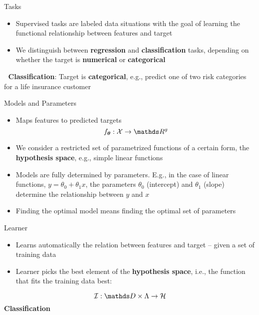 \documentclass[11pt,compress,t,notes=noshow, xcolor=table]{beamer}
\begin{document}
\begin{frame}{Tasks}
\begin{itemize}
  \item Supervised tasks are labeled data situations with the goal of learning the functional relationship between features and target
  \item We distinguish between \textbf{regression} and \textbf{classification} tasks, depending on whether the target is \textbf{numerical} or \textbf{categorical}
\end{itemize}
\vfill
{}
{
$\;$
}
{
\footnotesize \textbf{Classification}: Target is \textbf{categorical}, e.g., predict one of two risk categories for a life insurance customer
}
\end{frame}


\begin{frame2}[small]{Models and Parameters}
\begin{itemize}
  \item Maps features to predicted targets
  $$
  f_{\thetav} : \Xspace \rightarrow \R^g
  $$ 
\end{itemize}
\begin{itemize}
  \item  We consider a restricted set of parametrized functions of a certain form, the \textbf{hypothesis space}, e.g., simple linear functions
  \item Models are fully determined by parameters. E.g., in the case of linear functions, $y = \theta_0 + \theta_1 x $, the parameters $\theta_0$ (intercept) and $\theta_1$ (slope) determine the relationship between $y$ and $x$
  \item Finding the optimal model means finding the optimal set of parameters
\end{itemize}
\end{frame2}


\begin{frame}{Learner}
\begin{itemize}
  \item Learns automatically the relation between features and target -- given a set of training data
  \item Learner picks the best element of the \textbf{hypothesis space}, i.e., the function that fits the training data best:
\end{itemize} 
$$
\ind: \preimageInducerShort \rightarrow \Hspace
$$
\vfill
{}
{
\center\textbf{Classification}
}
\end{frame}
\end{document}
